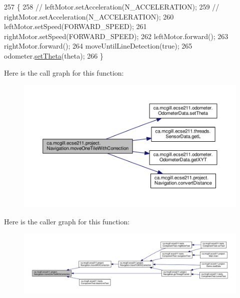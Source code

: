 \begin{DoxyCode}
257                                                       \{
258     \textcolor{comment}{// leftMotor.setAcceleration(N\_ACCELERATION);}
259     \textcolor{comment}{// rightMotor.setAcceleration(N\_ACCELERATION);}
260     leftMotor.setSpeed(FORWARD\_SPEED);
261     rightMotor.setSpeed(FORWARD\_SPEED);
262     leftMotor.forward();
263     rightMotor.forward();
264     moveUntilLineDetection(\textcolor{keyword}{true});
265     odometer.\hyperlink{classca_1_1mcgill_1_1ecse211_1_1odometer_1_1_odometer_data_a419b8f07c2c5374411c8e62298e9a402}{setTheta}(theta);
266   \}
\end{DoxyCode}
Here is the call graph for this function\+:
\nopagebreak
\begin{figure}[H]
\begin{center}
\leavevmode
\includegraphics[width=350pt]{classca_1_1mcgill_1_1ecse211_1_1project_1_1_navigation_afbe677941e2bd44e35452e1eff508ae9_cgraph}
\end{center}
\end{figure}
Here is the caller graph for this function\+:
\nopagebreak
\begin{figure}[H]
\begin{center}
\leavevmode
\includegraphics[width=350pt]{classca_1_1mcgill_1_1ecse211_1_1project_1_1_navigation_afbe677941e2bd44e35452e1eff508ae9_icgraph}
\end{center}
\end{figure}
\mbox{\label{classca_1_1mcgill_1_1ecse211_1_1project_1_1_navigation_a48eeb9ae2da23664421e8da5642054c7}} 
